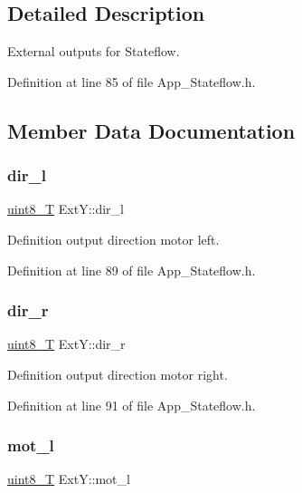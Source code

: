 \subsection{Detailed Description}
External outputs for Stateflow. 

Definition at line 85 of file App\+\_\+\+Stateflow.\+h.



\subsection{Member Data Documentation}
\mbox{\label{struct_ext_y_a95dca3013d0094be95ffd4af4d1a645e}} 
\subsubsection{\texorpdfstring{dir\_l}{dir\_l}}
{\footnotesize\ttfamily \mbox{\hyperlink{_app___stateflowtypes_8h_a2532a6244e023eee49f315c10f1f7c53}{uint8\+\_\+T}} Ext\+Y\+::dir\+\_\+l}



Definition output direction motor left. 



Definition at line 89 of file App\+\_\+\+Stateflow.\+h.

\mbox{\label{struct_ext_y_abe09271200dc96e32093a19312a23686}} 
\subsubsection{\texorpdfstring{dir\_r}{dir\_r}}
{\footnotesize\ttfamily \mbox{\hyperlink{_app___stateflowtypes_8h_a2532a6244e023eee49f315c10f1f7c53}{uint8\+\_\+T}} Ext\+Y\+::dir\+\_\+r}



Definition output direction motor right. 



Definition at line 91 of file App\+\_\+\+Stateflow.\+h.

\mbox{\label{struct_ext_y_a20f11c28f5b2d9f4a24766c4d56678e9}} 
\subsubsection{\texorpdfstring{mot\_l}{mot\_l}}
{\footnotesize\ttfamily \mbox{\hyperlink{_app___stateflowtypes_8h_a2532a6244e023eee49f315c10f1f7c53}{uint8\+\_\+T}} Ext\+Y\+::mot\+\_\+l}



